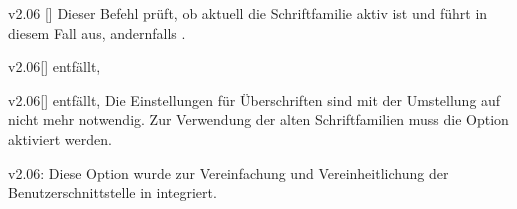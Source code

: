 \begin{Cessation}{v2.06}{%
  []
}%
\printobsoletelist%
%
Dieser Befehl prüft, ob aktuell die Schriftfamilie \DIN aktiv ist und führt in 
diesem Fall  aus, andernfalls . 
\end{Cessation}

\begin{Cessation}{v2.06}[]{}{%
  entfällt, %
}
\begin{Cessation}{v2.06}[]{}{%
  entfällt, %
}
\printobsoletelist%
%
Die Einstellungen für Überschriften sind mit der Umstellung auf \OpenSans nicht 
mehr notwendig. Zur Verwendung der alten Schriftfamilien muss die Option 
 aktiviert werden.
\end{Cessation}
\end{Cessation}

\begin{Cessation}{v2.06:}{%
}
\printobsoletelist%
%
Diese Option wurde zur Vereinfachung und Vereinheitlichung der 
Benutzerschnittstelle in  integriert.
\end{Cessation}

